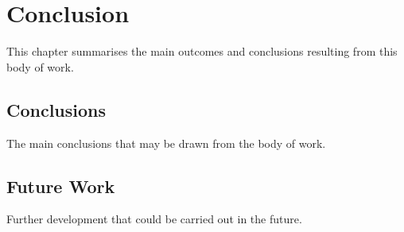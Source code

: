 \chapter{Conclusion}\label{ch:Conclusion}

This chapter summarises the main outcomes and conclusions resulting from this body of work.

\section{Conclusions}

The main conclusions that may be drawn from the body of work.

\section{Future Work}

Further development that could be carried out in the future.